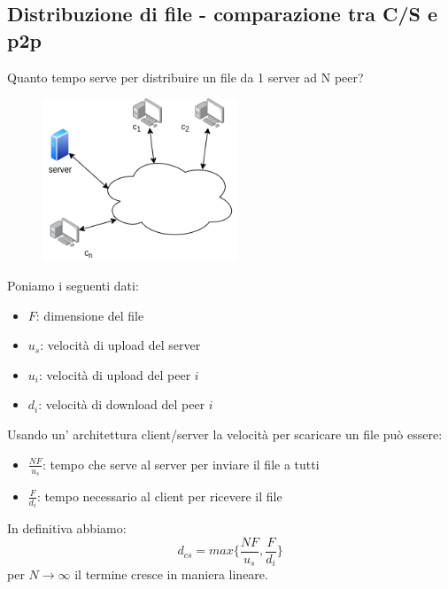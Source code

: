 \subsection{Distribuzione di file - comparazione tra C/S e p2p}
Quanto tempo serve per distribuire un file da 1 server ad N peer?
\begin{figure}[H]
    \centering
    \includegraphics[width=220px]{images/2_Applicazioni_di_rete/distribuzione_file.png}
\end{figure}
Poniamo i seguenti dati:
\begin{itemize}
    \item $F$: dimensione del file
    \item $u_s$: velocità di upload del server
    \item $u_i$: velocità di upload del peer $i$
    \item $d_i$: velocità di download del peer $i$
\end{itemize}
Usando un' architettura client/server la velocità per scaricare un file può essere:
\begin{itemize}
    \item $\frac{NF}{u_s}$: tempo che serve al server per inviare il file a tutti
    \item $\frac{F}{d_i}$: tempo necessario al client per ricevere il file
\end{itemize}
In definitiva abbiamo:
$$ d_{cs} = max\{ \frac{NF}{u_s}, \frac{F}{d_i} \} $$
per $N \xrightarrow{} \infty$ il termine cresce in maniera lineare.

